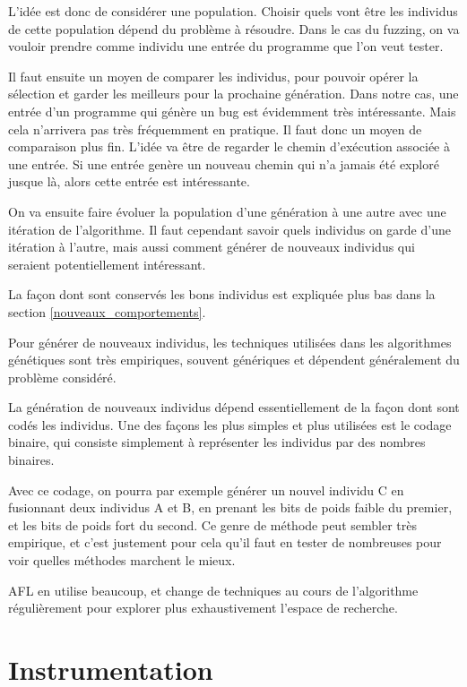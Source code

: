 L'idée est donc de considérer une population. Choisir quels vont être les
individus de cette population dépend du problème à résoudre. Dans le cas du
fuzzing, on va vouloir prendre comme individu une entrée du programme que
l'on veut tester.

Il faut ensuite un moyen de comparer les individus, pour pouvoir opérer la
sélection et garder les meilleurs pour la prochaine génération. Dans notre
cas, une entrée d'un programme qui génère un bug est évidemment très
intéressante. Mais cela n'arrivera pas très fréquemment en pratique. Il faut
donc un moyen de comparaison plus fin. L'idée va être de regarder le chemin
d'exécution associée à une entrée. Si une entrée genère un nouveau chemin
qui n'a jamais été exploré jusque là, alors cette entrée est intéressante.

On va ensuite faire évoluer la population d'une génération à une autre avec
une itération de l'algorithme. Il faut cependant savoir quels individus on
garde d'une itération à l'autre, mais aussi comment générer de nouveaux
individus qui seraient potentiellement intéressant.

La façon dont sont conservés les bons individus est expliquée plus bas dans
la section \ref{nouveaux_comportements}.

Pour générer de nouveaux individus, les techniques utilisées dans les
algorithmes génétiques sont très empiriques, souvent génériques et
dépendent généralement du problème considéré.

La génération de nouveaux individus dépend essentiellement de la façon
dont sont codés les individus. Une des façons les plus simples et plus
utilisées est le codage binaire, qui consiste simplement à représenter
les individus par des nombres binaires.

Avec ce codage, on pourra par exemple générer un nouvel individu C en
fusionnant deux individus A et B, en prenant les bits de poids faible
du premier, et les bits de poids fort du second. Ce genre de méthode
peut sembler très empirique, et c'est justement pour cela qu'il faut
en tester de nombreuses pour voir quelles méthodes marchent le mieux.

AFL en utilise beaucoup, et change de techniques au cours de l'algorithme
régulièrement pour explorer plus exhaustivement l'espace de recherche.

\section{Instrumentation}\label{instrumentation}

